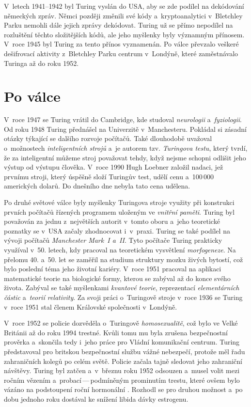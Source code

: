 \documentclass[a4paper, 11pt]{article}
\begin{document}
V~letech 1941--1942 byl Turing vyslán do USA, aby se zde podílel na dekódování
německých zpráv. Němci později změnili své kódy a~kryptoanalytici v~Bletchley
Parku nemohli dále jejich zprávy dekódovat. Turing už se přímo nepodílel na
rozluštění těchto složitějších kódů, ale jeho myšlenky byly významným
přínosem. V~roce 1945 byl Turing za tento přínos vyznamenán. Po válce převzalo
veškeré dešifrovací aktivity z~Bletchley Parku centrum v~Londýně, které
zaměstnávalo Turinga až do roku 1952.


\section{Po válce}

V~roce 1947 se Turing vrátil do Cambridge, kde studoval \emph{neurologii}
a~\emph{fyziologii}. Od roku 1948 Turing přednášel na Univerzitě
v~Manchesteru. Pokládal si zásadní otázky týkající se dalšího rozvoje
počítačů. Také dlouhodobě uvažoval o~možnostech \emph{inteligentních strojů}
a~je autorem tzv. \emph{Turingova testu}, který tvrdí, že za inteligentní
můžeme stroj považovat tehdy, když nejsme schopni odlišit jeho výstup od
výstupu člověka. V~roce 1990 Hugh Loebner založil nadaci, jež prvnímu stroji,
který úspěšně složí Turingův test, udělí cenu a~100\,000 amerických dolarů.
Do dnešního dne nebyla tato cena udělena.

Po druhé světové válce byly myšlenky Turingova stroje využity při konstrukci
prvních počítačů řízených programem uloženým ve \emph{vnitřní paměti}. Turing
byl považován za jednu z~největších autorit v~tomto oboru a~jeho teoretické
poznatky se v~USA začaly zhodnocovat i~v~praxi. Turing se také podílel
na vývoji počítačů \emph{Manchester Mark~I a~II}. Tyto počítače Turing
prakticky využíval v~50. letech, kdy pracoval na teoretickém vysvětlení
\emph{morfogeneze}. Na přelomu 40. a~50. let se zaměřil na studium
struktury mozku živých bytostí, což bylo poslední téma jeho životní kariéry.
V~roce 1951 pracoval na aplikaci matematické teorie na biologické formy,
kterou se zabýval až do konce svého života. Zabýval se také myšlenkami
\emph{kvantové teorie}, reprezentací \emph{elementárních částic}
a~\emph{teorií relativity}. Za svoji práci o~Turingově stroje v~roce 1936 se
Turing v~roce 1951 stal členem Královské společnosti v~Londýně.

V~roce 1952 se policie dozvěděla o~Turingově \emph{homosexualitě}, což bylo ve
Velké Británii až do roku 1994 trestné. Kvůli tomu mu byla zrušena
bezpečnostní prověrka a~skončila tedy i~jeho práce pro Vládní komunikační
centrum. Turing představoval pro britskou bezpečnostní službu vážné
nebezpečí, protože měl řadu zahraničních kolegů po celém světě. Policie
začala tajně sledovat jeho zahraniční návštěvy. Turing byl zatčen a~v~březnu
roku 1952 odsouzen a~musel volit mezi ročním vězením
a~probací\,---\,podmíněným prominutím trestu, které ovšem bylo vázáno na
podstoupení roční hormonální . Rozhodl se pro druhou možnost
a~po dobu jednoho roku dostával ke snížení libida dávky estrogenu.
\end{document}
